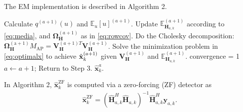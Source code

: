 \documentclass[conference,twocolumn,a4paper]{IEEEtran}
\theoremstyle{remark} \newtheorem{remark}{Remark}
\begin{document}
The EM implementation is described in Algorithm 2.
\begin{algorithm}\label{alg:coalitional}
\caption{EM Algorithm}
\begin{algorithmic}[1]
\footnotesize		 {}

        \State Calculate $q^{(a+1)}(u)$ and $\mathbb{E}_u[u]^{(a+1)}$.
		\State Update $\mathbb{E}_{\mathbf{H}_{a,k}}^{(a+1)}$ according to \eqref{eq:media}, and $\boldsymbol{\Omega}^{(a+1)}_{\mathbf{H}}$ as in \eqref{eq:rowcov}.
		\State Do the Cholesky decomposition:
			$\boldsymbol{\Omega}_{\mathbf{H}}^{\mathrm{(a+1)}}\!M_{\mathrm{AP}}$$=$$\mathbf{V}_{\mathbf{H}}^{(a +1)T} \mathbf{V}_{\mathbf{H}}^{(a+1)}$.
	\State Solve the minimization problem in \eqref{eq:optimalx} to achieve $\Hat{\mathbf{x}}_k^{(a+1)}$ given $\mathbf{V}_{\mathbf{H}}^{(a+1)}$ and $\mathbb{E}_{\mathbf{H}_{a,k}}^{(a+1)}$.
		\State convergence = 1
		\Else
		\State $a \gets a+1$;
		\State Return to Step 3.
		\EndIf
		\EndWhile
		\State \Return $\hat{\mathbf{x}}_k^{a}$.
\end{algorithmic}
\end{algorithm}

In Algorithm 2, $\hat{\mathbf{x}}_k^{\mathrm{ZF}}$ is computed via a zero-forcing (ZF) detector as 
\begin{align}
    \hat{\mathbf{x}}_k^{\mathrm{ZF}} = (\hat{\mathbf{H}}_{a,k}^H\hat{\mathbf{H}}_{a,k})^{-1}\hat{\mathbf{H}}_{a,k}^H\mathbf{y}_{a,k}.
\end{align}
\end{document}
